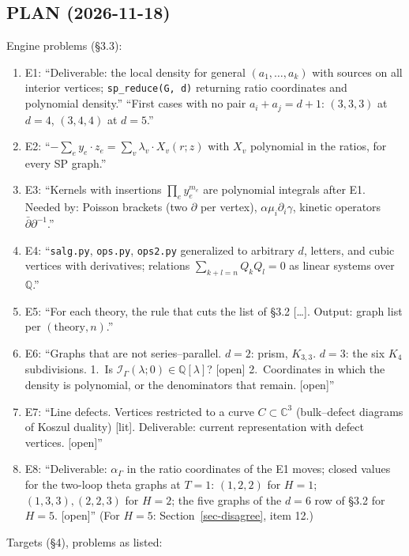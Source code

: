 \documentclass[10pt,a4paper]{article}
\numberwithin{equation}{section}
\begin{document}
\subsection{\textsf{PLAN} (2026-11-18)}
Engine problems (\S3.3):
\begin{enumerate}\itemsep1pt
\item E1: ``Deliverable: the local density for general $(a_1,\dots,a_k)$ with sources on all interior vertices; \texttt{sp\_reduce(G, d)} returning ratio coordinates and polynomial density.'' ``First cases with no pair $a_i+a_j=d+1$: $(3,3,3)$ at $d=4$, $(3,4,4)$ at $d=5$.''
\item E2: ``$-\sum_ey_e\cdot z_e=\sum_v\lambda_v\cdot X_v(r;z)$ with $X_v$ polynomial in the ratios, for every SP graph.''
\item E3: ``Kernels with insertions $\prod_ey_e^{m_e}$ are polynomial integrals after E1. Needed by: Poisson brackets (two $\partial$ per vertex), $\alpha\mu_i\partial_i\gamma$, kinetic operators $\bar\partial\partial^{-1}$.''
\item E4: ``\texttt{salg.py}, \texttt{ops.py}, \texttt{ops2.py} generalized to arbitrary $d$, letters, and cubic vertices with derivatives; relations $\sum_{k+l=n}Q_kQ_l=0$ as linear systems over $\mathbb Q$.''
\item E5: ``For each theory, the rule that cuts the list of \S3.2 [\dots]. Output: graph list per $(\text{theory},n)$.''
\item E6: ``Graphs that are not series--parallel. $d=2$: prism, $K_{3,3}$. $d=3$: the six $K_4$ subdivisions. 1.\ Is $\mathcal I_\Gamma(\lambda;0)\in\mathbb Q[\lambda]$? [open] 2.\ Coordinates in which the density is polynomial, or the denominators that remain. [open]''
\item E7: ``Line defects. Vertices restricted to a curve $C\subset\mathbb C^3$ (bulk--defect diagrams of Koszul duality) [lit]. Deliverable: current representation with defect vertices. [open]''
\item E8: ``Deliverable: $\alpha_\Gamma$ in the ratio coordinates of the E1 moves; closed values for the two-loop theta graphs at $T=1$: $(1,2,2)$ for $H=1$; $(1,3,3),(2,2,3)$ for $H=2$; the five graphs of the $d=6$ row of \S3.2 for $H=5$. [open]'' (For $H=5$: Section~\ref{sec-disagree}, item 12.)
\end{enumerate}
Targets (\S4), problems as listed:
\end{document}
